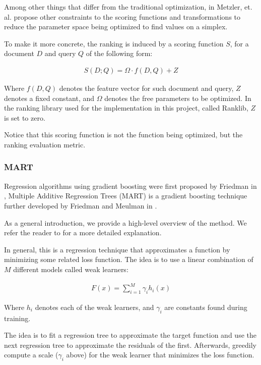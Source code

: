 Among other things that differ from the traditional optimization, in \cite{Metzler2006LinearFM} Metzler, et. al. propose 
other constraints to the scoring functions and transformations to reduce the parameter space 
being optimized to find values on a simplex.

To make it more concrete, the ranking is induced by a scoring function $S$, for a document $D$ and query $Q$
 of the following form:

\begin{align*}
S(D; Q) = \Omega \cdot f(D, Q) + Z
\end{align*}

Where $f(D, Q)$ denotes the feature vector for such document and query, $Z$ denotes a fixed constant, and $\Omega$
denotes the free parameters to be optimized. In the ranking library used for the implementation in this project, called Ranklib, $Z$ is set to zero.

Notice that this scoring function is not the function being optimized, but the ranking evaluation metric.

\subsubsection{MART}
Regression algorithms using gradient boosting were first proposed by Friedman in \cite{Friedman2001GreedyFA},
Multiple Additive Regression Trees (MART) is a gradient boosting technique further developed by Friedman and
Meulman in \cite{Friedman2003MultipleAR}.

As a general introduction, we provide a high-level overview of the method. We refer the reader to \cite{Friedman2001GreedyFA} 
for a more detailed explanation.

In general, this is a regression technique that approximates a function by minimizing some related loss 
function. The idea is to use a linear combination of $M$ different models called weak learners:

\begin{align*}
F(x) = \sum_{i=1}^M \gamma_i h_i(x)
\end{align*}

Where $h_i$ denotes each of the weak learners, and $\gamma_i$ are constants found during training.

The idea is to fit a regression tree to approximate the target function and use the next regression tree to
approximate the residuals of the first. Afterwards, greedily compute a scale ($\gamma_i$ above) for the weak learner that minimizes
the loss function.

